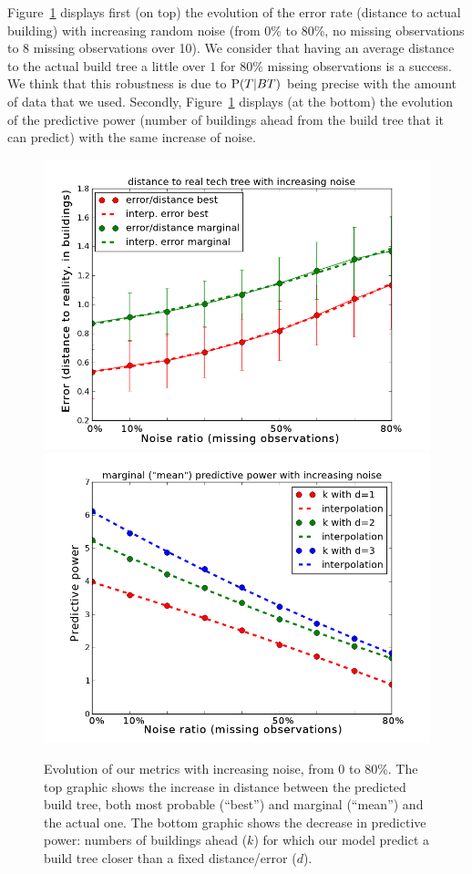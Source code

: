 Figure~\ref{fig:buildtreenoise} displays first (on top) the evolution of the error rate (distance to actual building) with increasing random noise (from 0\% to 80\%, no missing observations to 8 missing observations over 10). We consider that having an average distance to the actual build tree a little over $1$ for 80\% missing observations is a success. We think that this robustness is due to $\mathrm{P}(T|BT)$ being precise with the amount of data that we used. Secondly, Figure~\ref{fig:buildtreenoise} displays (at the bottom) the evolution of the predictive power (number of buildings ahead from the build tree that it can predict) with the same increase of noise.

\begin{figure}[htp]
\begin{center}
\includegraphics[width=0.7\columnwidth]{images/error_noise2.png}\\
\includegraphics[width=0.7\columnwidth]{images/predictive_power_noise2.png}
\end{center}
\caption{Evolution of our metrics with increasing noise, from 0 to 80\%. The top graphic shows the increase in distance between the predicted build tree, both most probable (``best'') and marginal (``mean'') and the actual one. The bottom graphic shows the decrease in predictive power: numbers of buildings ahead ($k$) for which our model predict a build tree closer than a fixed distance/error ($d$).}
\label{fig:buildtreenoise}
\end{figure}

